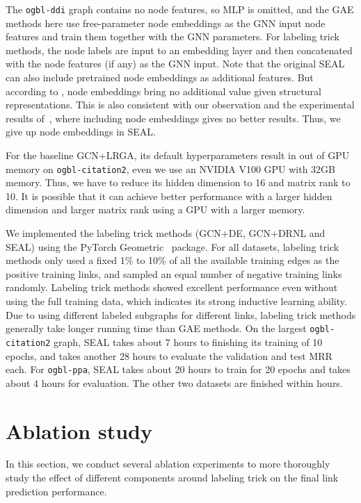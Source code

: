 \documentclass{article}
\begin{document}
The \texttt{ogbl-ddi} graph contains no node features, so MLP is omitted, and the GAE methods here use free-parameter node embeddings as the GNN input node features and train them together with the GNN parameters. For labeling trick methods, the node labels are input to an embedding layer and then concatenated with the node features (if any) as the GNN input. Note that the original SEAL can also include pretrained node embeddings as additional features. But according to \citep{Srinivasan2020On}, node embeddings bring no additional value given structural representations. This is also consistent with our observation and the experimental results of~\citep{zhang2018link}, where including node embeddings gives no better results. Thus, we give up node embeddings in SEAL.



For the baseline GCN+LRGA, its default hyperparameters result in out of GPU memory on \texttt{ogbl-citation2}, even we use an NVIDIA V100 GPU with 32GB memory. Thus, we have to reduce its hidden dimension to 16 and matrix rank to 10. It is possible that it can achieve better performance with a larger hidden dimension and larger matrix rank using a GPU with a larger memory.

We implemented the labeling trick methods (GCN+DE, GCN+DRNL and SEAL) using the PyTorch Geometric~\citep{fey2019fast} package. For all datasets, labeling trick methods only used a fixed 1\% to 10\% of all the available training edges as the positive training links, and sampled an equal number of negative training links randomly. Labeling trick methods showed excellent performance even without using the full training data, which indicates its strong inductive learning ability. Due to using different labeled subgraphs for different links, labeling trick methods generally take longer running time than GAE methods. On the largest \texttt{ogbl-citation2} graph, SEAL takes about 7 hours to finishing its training of 10 epochs, and takes another 28 hours to evaluate the validation and test MRR each. For \texttt{ogbl-ppa}, SEAL takes about 20 hours to train for 20 epochs and takes about 4 hours for evaluation. The other two datasets are finished within hours. 






\section{Ablation study}\label{ablation}
In this section, we conduct several ablation experiments to more thoroughly study the effect of different components around labeling trick on the final link prediction performance.
\end{document}
